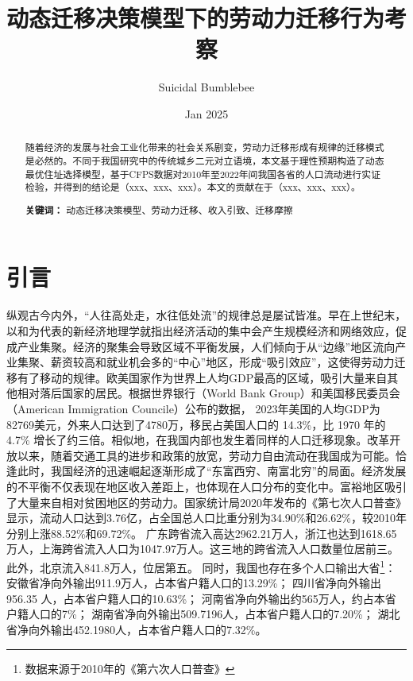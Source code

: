 \documentclass[a4paper,12pt]{article}
\title{动态迁移决策模型下的劳动力迁移行为考察}
\author{Suicidal Bumblebee}
\date{Jan 2025}
\begin{document}
\maketitle

\begin{abstract}
  随着经济的发展与社会工业化带来的社会关系剧变，劳动力迁移形成有规律的迁移模式是必然的。不同于我国研究中的传统城乡二元对立语境，本文基于理性预期构造了动态最优住址选择模型，基于CFPS数据对2010年至2022年间我国各省的人口流动进行实证检验，并得到的结论是（xxx、xxx、xxx）。本文的贡献在于（xxx、xxx、xxx）。

  \textbf{关键词：} 动态迁移决策模型、劳动力迁移、收入引致、迁移摩擦
\end{abstract}



\section{引言}

纵观古今内外，“人往高处走，水往低处流”的规律总是屡试皆准。早在上世纪末，以\cite{krugmanIncreasingReturnsEconomic1991}和\cite{fujitaSpatialEconomyCities1999}为代表的新经济地理学就指出经济活动的集中会产生规模经济和网络效应，促成产业集聚。经济的聚集会导致区域不平衡发展，人们倾向于从“边缘”地区流向产业集聚、薪资较高和就业机会多的“中心”地区，形成“吸引效应”，这使得劳动力迁移有了移动的规律。欧美国家作为世界上人均GDP最高的区域，吸引大量来自其他相对落后国家的居民。根据世界银行（World Bank Group）和美国移民委员会（American Immigration Councile）公布的数据，
2023年美国的人均GDP为82769美元，外来人口达到了4780万，移民占美国人口的 14.3\%，比 1970 年的 4.7\% 增长了约三倍。相似地，在我国内部也发生着同样的人口迁移现象。改革开放以来，随着交通工具的进步和政策的放宽，劳动力自由流动在我国成为可能。恰逢此时，我国经济的迅速崛起逐渐形成了“东富西穷、南富北穷”的局面。经济发展的不平衡不仅表现在地区收入差距上，也体现在人口分布的变化中。富裕地区吸引了大量来自相对贫困地区的劳动力。国家统计局2020年发布的《第七次人口普查》显示，流动人口达到3.76亿，占全国总人口比重分别为34.90\%和26.62\%，较2010年分别上涨88.52\%和69.72\%。
广东跨省流入高达2962.21万人，浙江也达到1618.65万人，上海跨省流入人口为1047.97万人。这三地的跨省流入人口数量位居前三。此外，北京流入841.8万人，位居第五。
同时，我国也存在多个人口输出大省\footnote{数据来源于2010年的《第六次人口普查》}：
安徽省净向外输出911.9万人，占本省户籍人口的13.29\%；
四川省净向外输出956.35 人，占本省户籍人口的10.63\%；
河南省净向外输出约565万人，约占本省户籍人口的7\%；
湖南省净向外输出509.7196人，占本省户籍人口的7.20\%；
湖北省净向外输出452.1980人，占本省户籍人口的7.32\%。
\end{document}

